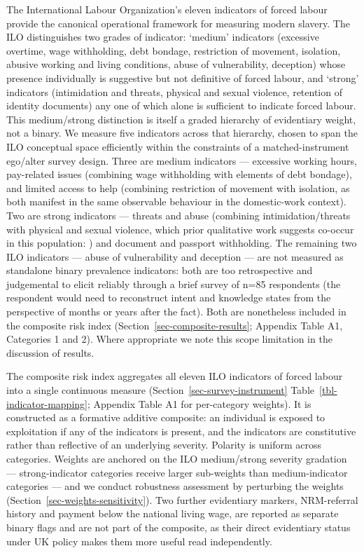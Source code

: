 \documentclass[
  12pt,
  letterpaper,
  DIV=11,
  numbers=noendperiod]{scrartcl}
\begin{document}
The International Labour Organization's eleven indicators of forced
labour
\autocite{ILO11-indicators,international_labour_organization_global_2017}
provide the canonical operational framework for measuring modern
slavery. The ILO distinguishes two grades of indicator: `medium'
indicators (excessive overtime, wage withholding, debt bondage,
restriction of movement, isolation, abusive working and living
conditions, abuse of vulnerability, deception) whose presence
individually is suggestive but not definitive of forced labour, and
`strong' indicators (intimidation and threats, physical and sexual
violence, retention of identity documents) any one of which alone is
sufficient to indicate forced labour. This medium/strong distinction is
itself a graded hierarchy of evidentiary weight, not a binary. We
measure five indicators across that hierarchy, chosen to span the ILO
conceptual space efficiently within the constraints of a
matched-instrument ego/alter survey design. Three are medium indicators
--- excessive working hours, pay-related issues (combining wage
withholding with elements of debt bondage), and limited access to help
(combining restriction of movement with isolation, as both manifest in
the same observable behaviour in the domestic-work context). Two are
strong indicators --- threats and abuse (combining intimidation/threats
with physical and sexual violence, which prior qualitative work suggests
co-occur in this population: \textcite{yilm23-exploring}) and document
and passport withholding. The remaining two ILO indicators --- abuse of
vulnerability and deception --- are not measured as standalone binary
prevalence indicators: both are too retrospective and judgemental to
elicit reliably through a brief survey of n=85 respondents (the
respondent would need to reconstruct intent and knowledge states from
the perspective of months or years after the fact). Both are nonetheless
included in the composite risk index
(Section~\ref{sec-composite-results}; Appendix Table A1, Categories 1
and 2). Where appropriate we note this scope limitation in the
discussion of results.

The composite risk index aggregates all eleven ILO indicators of forced
labour into a single continuous measure
(Section~\ref{sec-survey-instrument} Table~\ref{tbl-indicator-mapping};
Appendix Table A1 for per-category weights). It is constructed as a
formative additive composite: an individual is exposed to exploitation
if any of the indicators is present, and the indicators are constitutive
rather than reflective of an underlying severity. Polarity is uniform
across categories. Weights are anchored on the ILO medium/strong
severity gradation --- strong-indicator categories receive larger
sub-weights than medium-indicator categories --- and we conduct
robustness assessment by perturbing the weights
(Section~\ref{sec-weights-sensitivity}). Two further evidentiary
markers, NRM-referral history and payment below the national living
wage, are reported as separate binary flags and are not part of the
composite, as their direct evidentiary status under UK policy makes them
more useful read independently.
\end{document}

